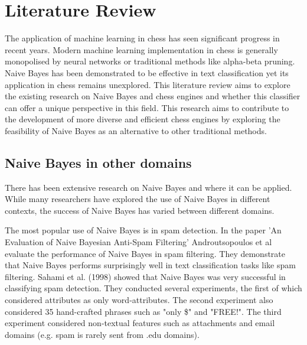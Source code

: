 \chapter{Literature Review}

The application of machine learning in chess has seen significant progress in recent years. Modern machine learning implementation in chess is generally monopolised by neural networks or traditional methods like alpha-beta pruning. Naive Bayes has been demonstrated to be effective in text classification yet its application in chess remains unexplored. This literature review aims to explore the existing research on Naive Bayes and chess engines and whether this classifier can offer a unique perspective in this field. This research aims to contribute to the development of more diverse and efficient chess engines by exploring the feasibility of Naive Bayes as an alternative to other traditional methods.


\section{Naive Bayes in other domains}
There has been extensive research on Naive Bayes and where it can be applied. While many researchers have explored the use of Naive Bayes in different contexts, the success of Naive Bayes has varied between different domains.

The most popular use of Naive Bayes is in spam detection. In the paper 'An Evaluation of Naive Bayesian Anti-Spam Filtering'  Androutsopoulos et al \cite{androutsopoulosEvaluationNaiveBayesian2000} evaluate the performance of Naive Bayes in spam filtering. They demonstrate that Naive Bayes performs surprisingly well in text classification tasks like spam filtering. Sahami et al. (1998) \cite{sahamiBayesianApproachFiltering} showed that Naive Bayes was very successful in classifying spam detection. They conducted several experiments, the first of which considered attributes as only word-attributes. The second experiment also considered 35 hand-crafted phrases such as "only \$" and "FREE!". The third experiment considered non-textual features such as attachments and email domains (e.g. spam is rarely sent from .edu domains). 


